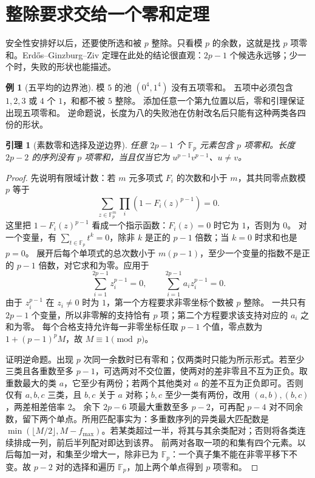 \documentclass[11pt,a4paper,oneside,openany]{book}
\newcommand{\F}{\mathbb F}
\newtheorem{lemma}[theorem]{引理}
\theoremstyle{definition}
\newtheorem{example}[theorem]{例}
\numberwithin{equation}{chapter}
\begin{document}
\section{整除要求交给一个零和定理}
安全性安排好以后，还要使所选和被 $p$ 整除。只看模 $p$ 的余数，这就是找 $p$ 项零和。Erdős--Ginzburg--Ziv 定理在此处的结论很直观：$2p-1$ 个候选永远够；少一个时，失败的形状也能描述。
\begin{example}[五平均的边界池]
模 $5$ 的池 $(0^4,1^4)$ 没有五项零和。
五项中必须包含 $1,2,3$ 或 $4$ 个 $1$，和都不被 $5$ 整除。
添加任意一个第九位置以后，零和引理保证出现五项零和。
逆命题说，长度为八的失败池在仿射改名后只能有这种两类各四份的形状。
\end{example}
\begin{lemma}[素数零和选择及逆边界]\label{lem:egz}
任意 $2p-1$ 个 $\F_p$ 元素包含 $p$ 项零和。长度 $2p-2$ 的序列没有 $p$ 项零和，当且仅当它为 $u^{p-1}v^{p-1}$、$u\ne v$。
\end{lemma}
\begin{proof}
先说明有限域计数：若 $m$ 元多项式 $F_i$ 的次数和小于 $m$，其共同零点数模 $p$ 等于
\[\sum_{z\in\F_p^m}\prod_i(1-F_i(z)^{p-1})=0.
\]
这里把 $1-F_i(z)^{p-1}$ 看成一个指示函数：$F_i(z)=0$ 时它为 $1$，否则为 $0$。
对一个变量，有 $\sum_{t\in\F_p}t^k=0$，除非 $k$ 是正的 $p-1$ 倍数；当 $k=0$ 时求和也是 $p=0$。
展开后每个单项式的总次数小于 $m(p-1)$，至少一个变量的指数不是正的 $p-1$ 倍数，对它求和为零。应用于
\[\sum_{i=1}^{2p-1}z_i^{p-1}=0,\qquad
\sum_{i=1}^{2p-1}a_i z_i^{p-1}=0.
\]
由于 $z_i^{p-1}$ 在 $z_i\ne0$ 时为 $1$，第一个方程要求非零坐标个数被 $p$ 整除。
一共只有 $2p-1$ 个变量，所以非零解的支持恰有 $p$ 项；第二个方程要求该支持对应的 $a_i$ 之和为零。
每个合格支持允许每一非零坐标任取 $p-1$ 个值，零点数为 $1+(p-1)^p M$，故 $M\equiv1\pmod p$。

证明逆命题。出现 $p$ 次同一余数时已有零和；仅两类时只能为所示形式。若至少三类且各重数至多 $p-1$，可选两对不交位置，使两对的差非零且不互为正负。取重数最大的类 $a$，它至少有两份；若两个其他类对 $a$ 的差不互为正负即可。否则仅有 $a,b,c$ 三类，且 $b,c$ 关于 $a$ 对称；$b,c$ 至少一类有两份，改用 $(a,b),(b,c)$，两差相差倍率 $2$。
余下 $2p-6$ 项最大重数至多 $p-2$，可再配 $p-4$ 对不同余数，留下两个单点。所用匹配事实为：多重数序列的异类最大匹配数是 $\min(\lfloor M/2\rfloor,M-f_{\max})$。若某类超过一半，将其与其余类配对；否则将各类连续排成一列，前后半列配对即达到该界。
前两对各取一项的和集有四个元素。以后每加一对，和集至少增大一，除非已为 $\F_p$：一个真子集不能在非零平移下不变。故 $p-2$ 对的选择和遍历 $\F_p$，加上两个单点得到 $p$ 项零和。
\end{proof}
\end{document}
